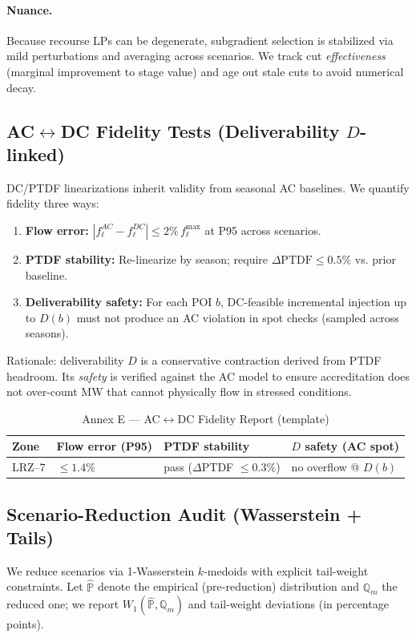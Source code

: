 \documentclass[11pt]{article}
\numberwithin{equation}{section}
\theoremstyle{definition}
\theoremstyle{remark}
\begin{document}
\paragraph{Nuance.}
Because recourse LPs can be degenerate, subgradient selection is stabilized via mild perturbations and averaging across scenarios. We track cut \emph{effectiveness} (marginal improvement to stage value) and age out stale cuts to avoid numerical decay.

\subsection{AC\texorpdfstring{$\leftrightarrow$}{<->}DC Fidelity Tests (Deliverability \texorpdfstring{$D$}{D}-linked)}
\label{E5}
DC/PTDF linearizations inherit validity from seasonal AC baselines. We quantify fidelity three ways:

\begin{enumerate}[leftmargin=1.2em]
  \item \textbf{Flow error:} $|f^{AC}_\ell - f^{DC}_\ell| \le 2\%\,f^{\max}_\ell$ at P95 across scenarios.
  \item \textbf{PTDF stability:} Re-linearize by season; require $\Delta\mathrm{PTDF}\le 0.5\%$ vs. prior baseline.
  \item \textbf{Deliverability safety:} For each POI $b$, DC-feasible incremental injection up to $D(b)$ must not produce an AC violation in spot checks (sampled across seasons). 
\end{enumerate}

\noindent Rationale: deliverability $D$ is a conservative contraction derived from PTDF headroom. Its \emph{safety} is verified against the AC model to ensure accreditation does not over-count MW that cannot physically flow in stressed conditions.

\begin{table}[h]
\centering
\caption{Annex E — AC$\leftrightarrow$DC Fidelity Report (template)}
\label{tab:acdctemplate}
\begin{tabular}{@{}llll@{}}
\toprule
\textbf{Zone} & \textbf{Flow error (P95)} & \textbf{PTDF stability} & \textbf{$D$ safety (AC spot)} \\
\midrule
LRZ--7 & $\le 1.4\%$ & pass ($\Delta$PTDF $\le 0.3\%$) & no overflow @ $D(b)$ \\
\bottomrule
\end{tabular}
\end{table}

\subsection{ Scenario-Reduction Audit (Wasserstein + Tails)}
\label{E6}
We reduce scenarios via 1-Wasserstein $k$-medoids with explicit tail-weight constraints. Let $\widehat{\mathbb{P}}$ denote the empirical (pre-reduction) distribution and $\mathbb{Q}_m$ the reduced one; we report $W_1(\widehat{\mathbb{P}},\mathbb{Q}_m)$ and tail-weight deviations (in percentage points).
\end{document}
